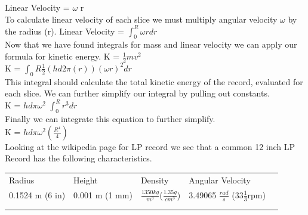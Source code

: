 \documentclass[a4paper, 11pt, oneside]{book} %
\begin{document}
\newline
{\large {Linear Velocity = $\omega$ r \\} } 
\vspace{0.5\baselineskip} %
To calculate linear velocity of each slice  we must multiply angular velocity $\omega$ by the radius (r). \newline
\newline
{\large {Linear Velocity = $\int_{0}^{R} \omega r dr$\\} }
\vspace{0.5\baselineskip} %
Now that we have found integrals for mass and linear velocity we can apply our formula for kinetic energy. \newline
\newline
{\large {K = $\frac{1}{2}mv^2$ \\} }
\vspace{0.5\baselineskip} %
{\large {K = $\int_{0}{R} \frac{1}{2}(hd2\pi(r))(\omega r)^2 dr$ \\} }
\vspace{0.5\baselineskip} %
This integral should calculate the total kinetic energy of the record, evaluated for each slice. We can further simplify our integral by pulling out constants.\\
\vspace{0.5\baselineskip} %
{\large {K = $hd\pi \omega^2$ $\int_{0}^{R} r^3 dr$ \\} }
\vspace{0.5\baselineskip} %
Finally we can integrate this equation to further simplify. \\
\vspace{0.5\baselineskip} %
{\large {K = $hd\pi \omega^2(\frac{R^4}{4})$\\} }
Looking at the wikipedia page for LP record we see that a common 12 inch LP Record has the following characteristics.\\
\vspace{0.5\baselineskip} %
\begin{table}[!h]
\centering
\begin{tabular}{lllll}
Radius & Height & Density & Angular Velocity &  \\
0.1524 m (6 in) & 0.001 m (1 mm) & $\frac{1350kg}{m^3}$($\frac{1.35 g}{cm^3}$) & 3.49065 $\frac{rad}{s}$ (33$\frac{1}{3}$rpm) &  \\
 &  &  &  &  \\
 &  &  &  & 
\end{tabular}
\end{table}
\end{document}
